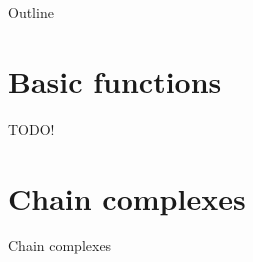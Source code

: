 \newcommand{\QPAIntroPartNumber}{2}




\begin{frame}
  \titlepage
\end{frame}

\begin{frame}{Outline}
  \tableofcontents
\end{frame}

\section{Basic functions}

\begin{frame}
TODO!
\end{frame}


\section{Chain complexes}

\begin{frame}{Chain complexes}
\end{frame}


